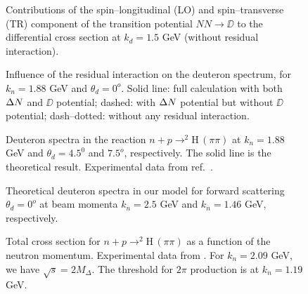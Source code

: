 \begin{figure}
  \begin{center}
  \end{center}
  \caption{Contributions of the spin--longitudinal (LO) and 
    spin--transverse (TR) component of the transition potential 
    $NN \to \DD$ to the differential cross section at $k_d = 1.5$ GeV
    (without residual interaction).}
  \label{fig:angdist2}
\end{figure}  

\begin{figure}
  \begin{center}  
  \end{center}
  \caption{Influence of the residual interaction on the deuteron spectrum,
    for $k_n = 1.88$ GeV and $\theta_d = 0^o$. Solid line: full calculation
    with both ${\Delta N}$ and $\DD$ potential; dashed: with ${\Delta N}$ potential but 
    without $\DD$ potential; dash--dotted: without any residual interaction.}
  \label{fig:vinfl}
\end{figure}  

\begin{figure}
  \begin{center}
  \end{center}
  \caption{Deuteron spectra in the reaction $n+p \to ^2$H$\, (\pi\pi)$ at
    $k_n = 1.88$ GeV and $\theta_d = 4.5^0$ and $7.5^o$, respectively.
    The solid line is the theoretical result. Experimental data from ref.\ 
    \protect \cite{plouin78}.}
  \label{fig:anguldep}
\end{figure}  

\begin{figure}
  \begin{center}  
  \end{center}
  \caption{Theoretical deuteron spectra in our model for forward 
    scattering $\theta_d = 0^o$ at beam momenta $k_n = 2.5$ GeV and 
    $k_n = 1.46$ GeV, respectively.}
  \label{fig:energdep}
\end{figure}  

\begin{figure}
  \begin{center}
  \end{center}
  \caption{Total cross section for $n+p \to ^2$H$\, (\pi\pi)$ as 
     a function of the neutron momentum. Experimental data from 
     \protect \cite{plouin78,abdivaliev80,barnir73,hollas82}.
     For $k_n = 2.09$ GeV, we have $\sqrt{s} = 2 M_\Delta$.
     The threshold for $2 \pi$ production is at $k_n = 1.19$ GeV.}
  \label{fig:totcs}
\end{figure}  





